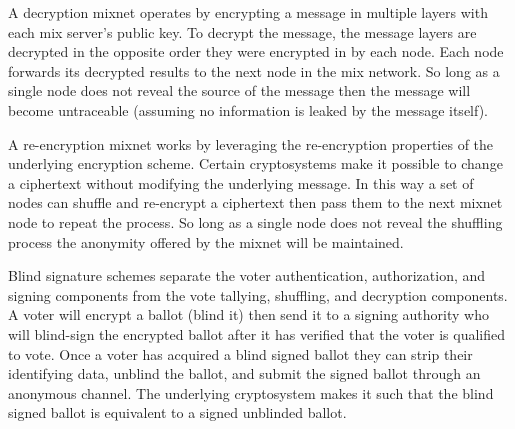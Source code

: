 A decryption mixnet operates by encrypting a message in multiple layers with
each mix server's public key. To decrypt the message, the message layers are
decrypted in the opposite order they were encrypted in by each node. Each node
forwards its decrypted results to the next node in the mix network. So long as a
single node does not reveal the source of the message then the message will
become untraceable (assuming no information is leaked by the message
itself).\cite{mix-networks}

A re-encryption mixnet works by leveraging the re-encryption properties of the
underlying encryption scheme. Certain cryptosystems make it possible to change a
ciphertext without modifying the underlying message. In this way a set of nodes
can shuffle and re-encrypt a ciphertext then pass them to the next mixnet node
to repeat the process. So long as a single node does not reveal the shuffling
process the anonymity offered by the mixnet will be
maintained.\cite{mix-networks,almost-correct-mixing}

Blind signature schemes separate the voter authentication, authorization, and
signing components from the vote tallying, shuffling, and decryption components.
A voter will encrypt a ballot (blind it) then send it to a signing authority who
will blind-sign the encrypted ballot after it has verified that the voter is
qualified to vote. Once a voter has acquired a blind signed ballot they can
strip their identifying data, unblind the ballot, and submit the signed ballot
through an anonymous channel. The underlying cryptosystem makes it such that the
blind signed ballot is equivalent to a signed unblinded ballot.\cite{e2e-viv}


%


